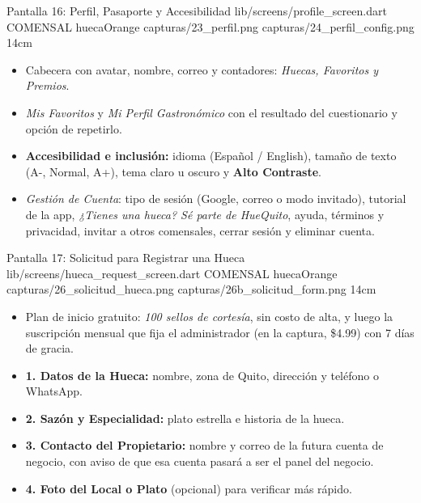 \pantalladoble
  {Pantalla 16: Perfil, Pasaporte y Accesibilidad}
  {lib/screens/profile\_screen.dart}
  {COMENSAL}
  {huecaOrange}
  {capturas/23_perfil.png}
  {capturas/24_perfil_config.png}
  {14cm}
  {
    \begin{itemize}[leftmargin=*, itemsep=2pt]
      \item Cabecera con avatar, nombre, correo y contadores: \textit{Huecas, Favoritos y Premios}.
      \item \textit{Mis Favoritos} y \textit{Mi Perfil Gastronómico} con el resultado del cuestionario y opción de repetirlo.
      \item \textbf{Accesibilidad e inclusión:} idioma (Español / English), tamaño de texto (A-, Normal, A+), tema claro u oscuro y \textbf{Alto Contraste}.
      \item \textit{Gestión de Cuenta}: tipo de sesión (Google, correo o modo invitado), tutorial de la app, \textit{¿Tienes una hueca? Sé parte de HueQuito}, ayuda, términos y privacidad, invitar a otros comensales, cerrar sesión y eliminar cuenta.
    \end{itemize}
  }

\pantalladoble
  {Pantalla 17: Solicitud para Registrar una Hueca}
  {lib/screens/hueca\_request\_screen.dart}
  {COMENSAL}
  {huecaOrange}
  {capturas/26_solicitud_hueca.png}
  {capturas/26b_solicitud_form.png}
  {14cm}
  {
    \begin{itemize}[leftmargin=*, itemsep=2pt]
      \item Plan de inicio gratuito: \textit{100 sellos de cortesía}, sin costo de alta, y luego la suscripción mensual que fija el administrador (en la captura, \$4.99) con 7 días de gracia.
      \item \textbf{1. Datos de la Hueca:} nombre, zona de Quito, dirección y teléfono o WhatsApp.
      \item \textbf{2. Sazón y Especialidad:} plato estrella e historia de la hueca.
      \item \textbf{3. Contacto del Propietario:} nombre y correo de la futura cuenta de negocio, con aviso de que esa cuenta pasará a ser el panel del negocio.
      \item \textbf{4. Foto del Local o Plato} (opcional) para verificar más rápido.
    \end{itemize}
  }

